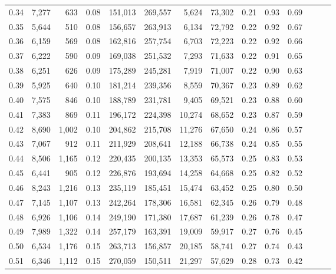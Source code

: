 \begin{tabular}{rrrrrrrrrrrrrr}
0.34 &   7,277 &    633 &  0.08 &  151,013 &  269,557 &   5,624 &  73,302 &  0.21 &  0.93 &      0.69 \\
0.35 &   5,644 &    510 &  0.08 &  156,657 &  263,913 &   6,134 &  72,792 &  0.22 &  0.92 &      0.67 \\
0.36 &   6,159 &    569 &  0.08 &  162,816 &  257,754 &   6,703 &  72,223 &  0.22 &  0.92 &      0.66 \\
0.37 &   6,222 &    590 &  0.09 &  169,038 &  251,532 &   7,293 &  71,633 &  0.22 &  0.91 &      0.65 \\
0.38 &   6,251 &    626 &  0.09 &  175,289 &  245,281 &   7,919 &  71,007 &  0.22 &  0.90 &      0.63 \\
0.39 &   5,925 &    640 &  0.10 &  181,214 &  239,356 &   8,559 &  70,367 &  0.23 &  0.89 &      0.62 \\
0.40 &   7,575 &    846 &  0.10 &  188,789 &  231,781 &   9,405 &  69,521 &  0.23 &  0.88 &      0.60 \\
0.41 &   7,383 &    869 &  0.11 &  196,172 &  224,398 &  10,274 &  68,652 &  0.23 &  0.87 &      0.59 \\
0.42 &   8,690 &  1,002 &  0.10 &  204,862 &  215,708 &  11,276 &  67,650 &  0.24 &  0.86 &      0.57 \\
0.43 &   7,067 &    912 &  0.11 &  211,929 &  208,641 &  12,188 &  66,738 &  0.24 &  0.85 &      0.55 \\
0.44 &   8,506 &  1,165 &  0.12 &  220,435 &  200,135 &  13,353 &  65,573 &  0.25 &  0.83 &      0.53 \\
0.45 &   6,441 &    905 &  0.12 &  226,876 &  193,694 &  14,258 &  64,668 &  0.25 &  0.82 &      0.52 \\
0.46 &   8,243 &  1,216 &  0.13 &  235,119 &  185,451 &  15,474 &  63,452 &  0.25 &  0.80 &      0.50 \\
0.47 &   7,145 &  1,107 &  0.13 &  242,264 &  178,306 &  16,581 &  62,345 &  0.26 &  0.79 &      0.48 \\
0.48 &   6,926 &  1,106 &  0.14 &  249,190 &  171,380 &  17,687 &  61,239 &  0.26 &  0.78 &      0.47 \\
0.49 &   7,989 &  1,322 &  0.14 &  257,179 &  163,391 &  19,009 &  59,917 &  0.27 &  0.76 &      0.45 \\
0.50 &   6,534 &  1,176 &  0.15 &  263,713 &  156,857 &  20,185 &  58,741 &  0.27 &  0.74 &      0.43 \\
0.51 &   6,346 &  1,112 &  0.15 &  270,059 &  150,511 &  21,297 &  57,629 &  0.28 &  0.73 &      0.42 \\

\end{tabular}
